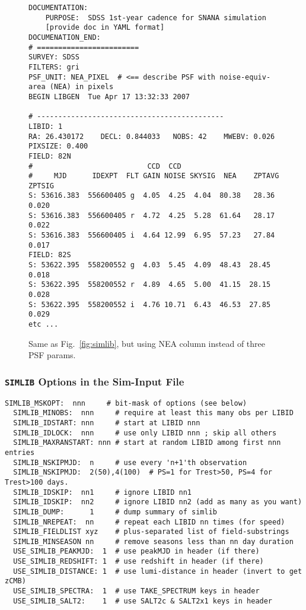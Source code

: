 \documentclass[12pt]{article}
\newcommand{\simlib}{{\tt SIMLIB}}
\begin{document}
{\begin{figure} [ht] 
\begin{center}
\begin{Verbatim}[frame=single]
DOCUMENTATION:
    PURPOSE:  SDSS 1st-year cadence for SNANA simulation
    [provide doc in YAML format]
DOCUMENATION_END:
# ========================
SURVEY: SDSS     
FILTERS: gri 
PSF_UNIT: NEA_PIXEL  # <== describe PSF with noise-equiv-area (NEA) in pixels
BEGIN LIBGEN  Tue Apr 17 13:32:33 2007
 
# -------------------------------------------- 
LIBID: 1 
RA: 26.430172    DECL: 0.844033   NOBS: 42    MWEBV: 0.026   PIXSIZE: 0.400 
FIELD: 82N
#                           CCD  CCD        
#     MJD      IDEXPT  FLT GAIN NOISE SKYSIG  NEA    ZPTAVG ZPTSIG
S: 53616.383  556600405 g  4.05  4.25  4.04  80.38   28.36  0.020 
S: 53616.383  556600405 r  4.72  4.25  5.28  61.64   28.17  0.022 
S: 53616.383  556600405 i  4.64 12.99  6.95  57.23   27.84  0.017 
FIELD: 82S
S: 53622.395  558200552 g  4.03  5.45  4.09  48.43  28.45  0.018 
S: 53622.395  558200552 r  4.89  4.65  5.00  41.15  28.15  0.028 
S: 53622.395  558200552 i  4.76 10.71  6.43  46.53  27.85  0.029 
etc ...
\end{Verbatim}
\end{center}
\caption{
  Same as Fig.~\ref{fig:simlib}, but using NEA column instead of
  three PSF params.
 }
\label{fig:simlib_nea}
\end{figure}



\clearpage
\subsubsection{{\simlib} Options in the Sim-Input File}
\label{sssec:simlib_options}

\begin{Verbatim}[frame=single]
  SIMLIB_MSKOPT:  nnn     # bit-mask of options (see below)
  SIMLIB_MINOBS:  nnn     # require at least this many obs per LIBID
  SIMLIB_IDSTART: nnn     # start at LIBID nnn
  SIMLIB_IDLOCK:  nnn     # use only LIBID nnn ; skip all others
  SIMLIB_MAXRANSTART: nnn # start at random LIBID among first nnn entries
  SIMLIB_NSKIPMJD:  n     # use every 'n+1'th observation
  SIMLIB_NSKIPMJD:  2(50),4(100)  # PS=1 for Trest>50, PS=4 for Trest>100 days.
  SIMLIB_IDSKIP:  nn1     # ignore LIBID nn1
  SIMLIB_IDSKIP:  nn2     # ignore LIBID nn2 (add as many as you want)  
  SIMLIB_DUMP:      1     # dump summary of simlib 
  SIMLIB_NREPEAT:  nn     # repeat each LIBID nn times (for speed)
  SIMLIB_FIELDLIST xyz    # plus-separated list of field-substrings
  SIMLIB_MINSEASON nn     # remove seasons less than nn day duration
  USE_SIMLIB_PEAKMJD:  1  # use peakMJD in header (if there)
  USE_SIMLIB_REDSHIFT: 1  # use redshift in header (if there)
  USE_SIMLIB_DISTANCE: 1  # use lumi-distance in header (invert to get zCMB)
  USE_SIMLIB_SPECTRA:  1  # use TAKE_SPECTRUM keys in header 
  USE_SIMLIB_SALT2:    1  # use SALT2c & SALT2x1 keys in header


\end{Verbatim}}
\end{document}
